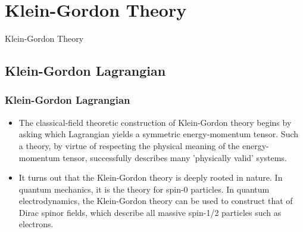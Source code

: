 \documentclass{beamer}
\begin{document}
\section{Klein-Gordon Theory}

\begin{frame}
\begin{center}
\Huge \textcolor{blue!50!gray}{Klein-Gordon Theory}
\end{center}
\end{frame}

\subsection{Klein-Gordon Lagrangian}

\begin{frame}
\frametitle{Klein-Gordon Lagrangian}

\begin{itemize}
\item The classical-field theoretic construction of Klein-Gordon theory begins by asking which Lagrangian yields a symmetric energy-momentum tensor. Such a theory, by virtue of respecting the physical meaning of the energy-momentum tensor, successfully describes many 'physically valid' systems.

\item It turns out that the Klein-Gordon theory is deeply rooted in nature. In quantum mechanics, it is the theory for spin-0 particles. In quantum electrodynamics, the Klein-Gordon theory can be used to construct that of Dirac spinor fields, which describe all massive spin-1/2 particles such as electrons.
\end{itemize}
\end{frame}
\end{document}
